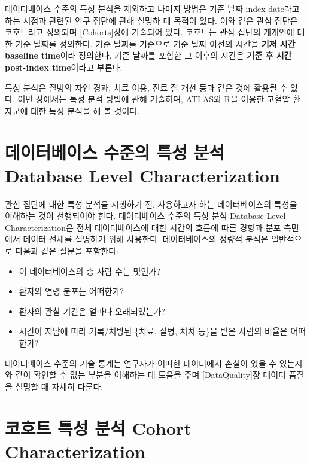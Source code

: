 \documentclass[10.5pt]{book}
\providecommand{\tightlist}{%
  \setlength{\itemsep}{0pt}\setlength{\parskip}{0pt}}
\theoremstyle{definition}
\theoremstyle{definition}
\theoremstyle{definition}
\theoremstyle{remark}
\begin{document}
데이터베이스 수준의 특성 분석을 제외하고 나머지 방법은 기준 날짜 index
date라고 하는 시점과 관련된 인구 집단에 관해 설명하 데 목적이 있다. 이와
같은 관심 집단은 코호트라고 정의되며 \ref{Cohorts}장에 기술되어 있다.
코호트는 관심 집단의 개개인에 대한 기준 날짜를 정의한다. 기준 날짜를
기준으로 기준 날짜 이전의 시간을 \textbf{기저 시간 baseline time}이라
정의한다. 기준 날짜를 포함한 그 이후의 시간은 \textbf{기준 후 시간
post-index time}이라고 부른다.

특성 분석은 질병의 자연 경과, 치료 이용, 진료 질 개선 등과 같은 것에
활용될 수 있다. 이번 장에서는 특성 분석 방법에 관해 기술하며, ATLAS와
R을 이용한 고혈압 환자군에 대한 특성 분석을 해 볼
것이다.
  

\section{데이터베이스 수준의 특성 분석 Database Level
Characterization}\label{----database-level-characterization}

관심 집단에 대한 특성 분석을 시행하기 전, 사용하고자 하는 데이터베이스의
특성을 이해하는 것이 선행되어야 한다. 데이터베이스 수준의 특성 분석
Database Level Characterization은 전체 데이터베이스에 대한 시간의 흐름에
따른 경향과 분포 측면에서 데이터 전체를 설명하기 위해 사용한다.
데이터베이스의 정량적 분석은 일반적으로 다음과 같은 질문을 포함한다:

\begin{itemize}
\tightlist
\item
  이 데이터베이스의 총 사람 수는 몇인가?
\item
  환자의 연령 분포는 어떠한가?
\item
  환자의 관찰 기간은 얼마나 오래되었는가?
\item
  시간이 지남에 따라 기록/처방된 \{치료, 질병, 처치 등\}을 받은 사람의
  비율은 어떠한가?
\end{itemize}

데이터베이스 수준의 기술 통계는 연구자가 어떠한 데이터에서 손실이 있을
수 있는지와 같이 확인할 수 없는 부분을 이해하는 데 도움을 주며
\ref{DataQuality}장 데이터 품질을 설명할 때 자세히 다룬다.

\section{코호트 특성 분석 Cohort
Characterization}\label{---cohort-characterization}
\end{document}
